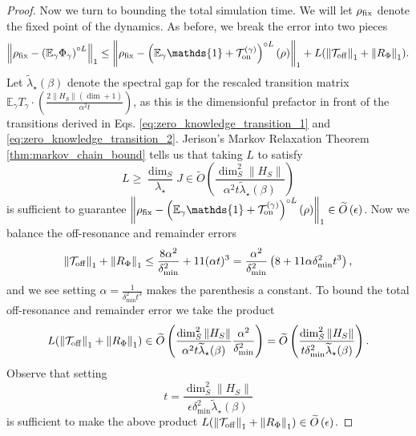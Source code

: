 \documentclass[
 amsmath,amssymb,
 aps,
onecolumn, 
nofootinbib]{revtex4-2}
\newcommand{\on}{\rm on}
\newcommand{\off}{\rm off}
\newcommand{\norm}[1]{\left\| #1 \right\|}
\newcommand{\EE}{\mathbb{E}}
\newcommand{\TT}{\mathcal{T}}
\newcommand{\bigotilde}[1]{\widetilde{O} \left( #1 \right)}
\newcommand{\identity}{\mathds{1}}
\begin{document}
\begin{proof}
    Now we turn to bounding the total simulation time. We will let $\rho_{\rm fix}$ denote the fixed point of the dynamics. As before, we break the error into two pieces
    \begin{equation}
        \norm{\rho_{\rm fix} - \left(\EE_\gamma \Phi_\gamma \right)^{\circ L}}_1 \le \norm{\rho_{\rm fix} - \left(\EE_\gamma \identity + \TT_{\on}^{(\gamma)}\right)^{\circ L} (\rho)}_1 + L(\norm{\TT_{\off}}_1 + \norm{R_{\Phi}}_1).
    \end{equation}
    Let $\widetilde{\lambda}_\star(\beta)$ denote the spectral gap for the rescaled transition matrix $\EE_\gamma T_\gamma \cdot \left(\frac{2 \norm{H_S} (\dim + 1)}{\alpha^2 t}\right)$, as this is the dimensionful prefactor in front of the transitions derived in Eqs. \eqref{eq:zero_knowledge_transition_1} and \eqref{eq:zero_knowledge_transition_2}. Jerison's Markov Relaxation Theorem \ref{thm:markov_chain_bound} tells us that taking $L$ to satisfy
    \begin{equation}
        L \ge \frac{\dim_S}{\lambda_\star} J \in \bigotilde{\frac{\dim_S^2 \norm{H_S}}{\alpha^2 t \widetilde{\lambda}_\star(\beta)}}\label{eq:Lbd}
    \end{equation}
    is sufficient to guarantee $\norm{\rho_{\rm fix} - \left(\EE_\gamma \identity + \TT_{\on}^{(\gamma)}\right)^{\circ L} (\rho)}_1 \in \bigotilde{\epsilon}$. Now we balance the off-resonance and remainder errors
    \begin{equation}
        \norm{\TT_{\off}}_1 + \norm{R_{\Phi}}_1 \le \frac{8 \alpha^2}{\delta_{\min}^2} + 11 (\alpha t)^3 = \frac{\alpha^2}{\delta_{\min}^2} \left( 8 + 11 \alpha \delta_{\min}^2 t^3 \right),
    \end{equation}
    and we see setting $\alpha = \frac{1}{\delta_{\min}^2 t^3}$ makes the parenthesis a constant.
    To bound the total off-resonance and remainder error we take the product
    \begin{equation}
        L(\norm{\TT_{\off}}_1 + \norm{R_{\Phi}}_1) \in \bigotilde{\frac{\dim_S^2 \norm{H_S}}{\alpha^2 t \widetilde{\lambda}_\star(\beta)} \frac{\alpha^2}{\delta_{\min}^2}} = \bigotilde{\frac{\dim_S^2 \norm{H_S}}{ t \delta_{\min}^2 \widetilde{\lambda}_\star(\beta)} }.
    \end{equation}
    Observe that setting 
    \begin{equation}
        t = \frac{\dim_S^2 \norm{H_S}}{\epsilon \delta_{\min}^2 \widetilde{\lambda}_\star(\beta)}
    \end{equation} 
    is sufficient to make the above product $L(\norm{\TT_{\off}}_1 + \norm{R_{\Phi}}_1) \in\bigotilde{\epsilon}$. 


\end{proof}
\end{document}
